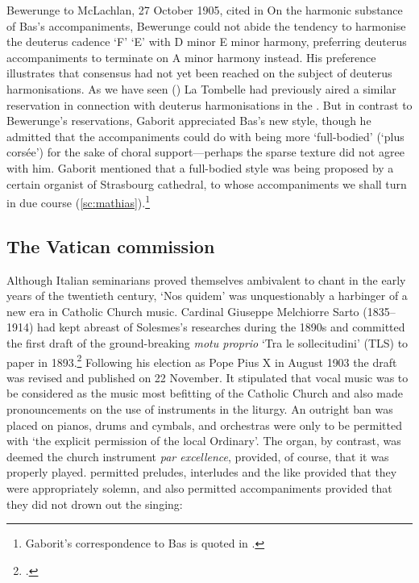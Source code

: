   {Bewerunge to McLachlan, 27 October 1905, cited in \cite[251--2]{McCarthyHeinrichBewerunge18622015}}
\noindent
On the harmonic substance of Bas's accompaniments, Bewerunge could not abide the tendency to harmonise the deuterus cadence `F' \rightarrow{} `E' with D minor \rightarrow{} E minor harmony, preferring deuterus accompaniments to terminate on A minor harmony instead.
His preference illustrates that consensus had not yet been reached on the subject of deuterus harmonisations.
As we have seen () La Tombelle had previously aired a similar reservation in connection with deuterus harmonisations in the \ldo{}.
But in contrast to Bewerunge's reservations, Gaborit appreciated Bas's new style, though he admitted that the accompaniments could do with being more `full-bodied' (`plus corsée') for the sake of choral support---perhaps the sparse texture did not agree with him.
Gaborit mentioned that a full-bodied style was being proposed by a certain organist of Strasbourg cathedral, to whose accompaniments we shall turn in due course (\cref{sc:mathias}).\footnote{Gaborit's correspondence to Bas is quoted in .}

\subsection{The Vatican commission}
\label{sc:new_edn}%
Although Italian seminarians proved themselves ambivalent to chant in the early years of the twentieth century, `Nos quidem' was unquestionably a harbinger of a new era in Catholic Church music.
Cardinal Giuseppe Melchiorre Sarto (1835--1914) had kept abreast of Solesmes's researches during the 1890s and committed the first draft of the ground-breaking \emph{motu proprio} `Tra le sollecitudini' (TLS) to paper in 1893.\footcites[186--7]{CombeHistoirerestaurationchant1969}[162]{CombeRestorationGregorianChant2003}
Following his election as Pope Pius X in August 1903 the draft was revised and published on 22 November.
It stipulated that vocal music was to be considered as the music most befitting of the Catholic Church and also made pronouncements on the use of instruments in the liturgy.
An outright ban was placed on pianos, drums and cymbals, and orchestras were only to be permitted with `the explicit permission of the local Ordinary'.
The organ, by contrast, was deemed the church instrument \emph{par excellence}, provided, of course, that it was properly played.
\tls{} permitted preludes, interludes and the like provided that they were appropriately solemn, and also permitted accompaniments provided that they did not drown out the singing:

